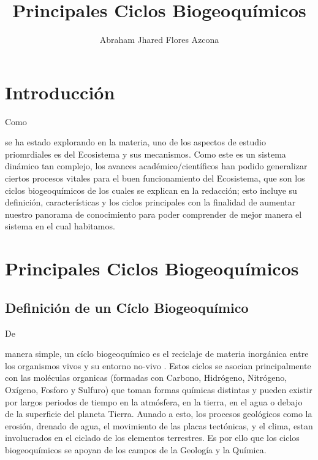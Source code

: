 \documentclass[stu, 12pt, letterpaper, donotrepeattitle, floatsintext, natbib]{apa7}
\title{\Large Principales Ciclos Biogeoquímicos}
\author{Abraham Jhared Flores Azcona} %
\affiliation{Instituto Tecnológico de Tijuana}
\begin{document}
\maketitle


\renewcommand\contentsname{Contenido}
\tableofcontents
\renewcommand{\listfigurename}{Figuras}
\listoffigures

\newpage
\section*{Introducción}
Como \begin{justifying}
    se ha estado explorando en la materia, uno de los aspectos de estudio priomrdiales es del Ecosistema y sus mecanismos. Como este es un sistema dinámico
    tan complejo, los avances académico/científicos han podido generalizar ciertos procesos vitales para el buen funcionamiento del Ecosistema, que son los ciclos biogeoquímicos de los cuales
    se explican en la redacción; esto incluye su definición, características y los ciclos principales con la finalidad de aumentar nuestro panorama de conocimiento para poder
    comprender de mejor manera el sistema en el cual habitamos.\par
\end{justifying}
\vspace{\baselineskip}
\section{Principales Ciclos Biogeoquímicos}
\subsection{Definición de un Cíclo Biogeoquímico}
De \begin{justifying}
    manera simple, un cíclo biogeoquímico es el reciclaje de materia inorgánica entre los organismos vivos y su entorno no-vivo \citep{openstax-no-date}.  
    Estos ciclos se asocian principalmente con las moléculas organicas (formadas con Carbono, Hidrógeno, Nitrógeno, Oxígeno, Fosforo y Sulfuro) que toman formas
    químicas distintas y pueden existir por largos periodos de tiempo en la atmósfera, en la tierra, en el agua o debajo de la superficie del planeta Tierra.
Aunado a esto, los procesos geológicos como la erosión, drenado de agua, el movimiento de las placas tectónicas, y el clima, estan involucrados en el ciclado de los
    elementos terrestres. Es por ello que los ciclos biogeoquímicos se apoyan de los campos de la Geología y la Química.\par
\end{justifying}
\vspace{\baselineskip}
\end{document}
